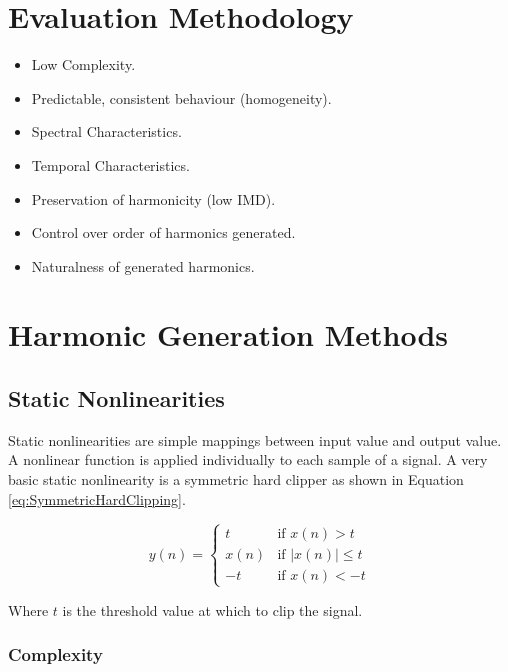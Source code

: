 \section{Evaluation Methodology}
\label{sec:Excitation-Evaluation}
	\note
	{
		\begin{itemize}
			\item Low Complexity.
			\item Predictable, consistent behaviour (homogeneity).
			\item Spectral Characteristics.
			\item Temporal Characteristics.
			\item Preservation of harmonicity (low IMD).
			\item Control over order of harmonics generated.
			\item Naturalness of generated harmonics.
		\end{itemize}
	}

\section{Harmonic Generation Methods}
\label{sec:Excitation-Methods}

	\subsection{Static Nonlinearities}
	\label{sec:Excitation-Statics}
		Static nonlinearities are simple mappings between input value and output value. A nonlinear function is
		applied individually to each sample of a signal. A very basic static nonlinearity is a symmetric hard
		clipper as shown in Equation \ref{eq:SymmetricHardClipping}.

		\begin{equation}
			y(n) = \begin{cases}
				t & \text{if $x(n) > t$} \\
				x(n) & \text{if $|x(n)| \leq t$} \\
				-t & \text{if $x(n) < -t$}
			\end{cases}
			\label{eq:SymmetricHardClipping}
		\end{equation}

		Where $t$ is the threshold value at which to clip the signal.

		\subsubsection*{Complexity}


